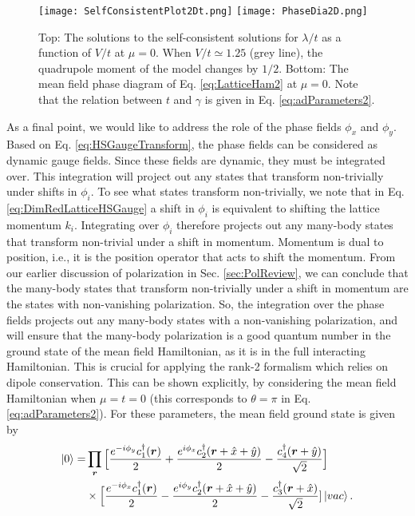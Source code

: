 \documentclass[prb,aps,twocolumn,groupaddress,floatfix]{revtex4-1}
\begin{document}
\begin{figure}
\texttt{[image: SelfConsistentPlot2Dt.png]}
\texttt{[image: PhaseDia2D.png]}
\caption{Top: The solutions to the self-consistent solutions for $\lambda/t$ as a function of $V/t$ at $\mu = 0$. When $V/t \simeq 1.25$ (grey line), the quadrupole moment of the model changes by $1/2$.  Bottom: The mean field phase diagram of Eq. \ref{eq:LatticeHam2} at $\mu = 0$. Note that the relation between $t$ and $\gamma$ is given in Eq. \ref{eq:adParameters2}.}
\label{fig:SelfConsistentPlotPD2D}
\end{figure}


As a final point, we would like to address the role of the phase fields $\phi_{x}$ and $\phi_{y}$.
Based on Eq. \ref{eq:HSGaugeTransform}, the phase fields can be considered as dynamic gauge fields. Since these fields are dynamic, they must be integrated over. This integration will project out any states that transform non-trivially under shifts in $\phi_i$. To see what states transform non-trivially, we note that in Eq. \ref{eq:DimRedLatticeHSGauge} a shift in $\phi_i$ is equivalent to shifting the lattice momentum $k_i$. Integrating over $\phi_i$ therefore projects out any many-body states that transform non-trivial under a shift in momentum. Momentum is dual to position, i.e., it is the position operator that acts to shift the momentum. From our earlier discussion of polarization in Sec. \ref{sec:PolReview}, we can conclude that the many-body states that transform non-trivially under a shift in momentum are the states with non-vanishing polarization. So, the integration over the phase fields projects out any many-body states with a non-vanishing polarization, and will ensure that the many-body polarization is a good quantum number in the ground state of the mean field Hamiltonian, as it is in the full interacting Hamiltonian. This is crucial for applying the rank-2 formalism which relies on dipole conservation. This can be shown explicitly, by considering the mean field Hamiltonian when $\mu=t= 0$ (this corresponds to $\theta = \pi$ in Eq. \ref{eq:adParameters2}). For these parameters, the mean field ground state is given by
\begin{equation}\begin{split}
\ket{0} = &\prod_{\bm{r}} \Big[\frac{e^{-i\phi_y} c^\dagger_1(\bm{r})}{2} + \frac{e^{i\phi_x} c^\dagger_2(\bm{r}+\hat{x}+\hat{y})}{2}  - \frac{c^\dagger_4(\bm{r}+\hat{y})}{\sqrt{2}}\Big]\\&\times \Big[ \frac{e^{-i\phi_x} c^\dagger_1(\bm{r})}{2} - \frac{e^{i\phi_y} c^\dagger_2(\bm{r}+\hat{x}+\hat{y})}{2}  - \frac{c^\dagger_3(\bm{r}+\hat{x})}{\sqrt{2}}]\ket{vac}.
\end{split}\label{eq:MFGround1}
\end{equation}
\end{document}
